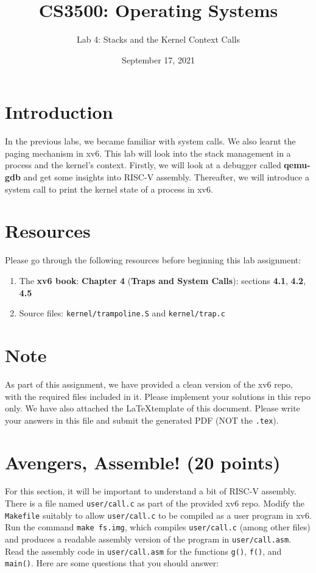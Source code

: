 \documentclass[11pt]{exam}
\title{\textbf{CS3500: Operating Systems}}
\subtitle{Lab 4: Stacks and the Kernel Context Calls\vspace{-1em}}
\date{September 17, 2021}
\begin{document}
\maketitle

\section*{Introduction} In the previous labs, we became familiar with system calls. We also learnt the paging mechanism in xv6. This lab will look into the stack management in a process and the kernel's context. Firstly, we will look at a debugger called \textbf{qemu-gdb} and get some insights into RISC-V assembly. Thereafter, we will introduce a system call to print the kernel state of a process in xv6.

\section*{Resources} Please go through the following resources before beginning this lab assignment:
\begin{enumerate}
    \item The \textbf{xv6 book}: \textbf{Chapter 4} (\textbf{Traps and System Calls}): sections \textbf{4.1}, \textbf{4.2}, \textbf{4.5}
    \item Source files: \texttt{kernel/trampoline.S} and \texttt{kernel/trap.c}
\end{enumerate}

\section*{Note} As part of this assignment, we have provided a clean version of the xv6 repo, with the required files included in it. Please implement your solutions in this repo only. We have also attached the \LaTeX template of this document. Please write your answers in this file and submit the generated PDF (NOT the \texttt{.tex}). 

\section{Avengers, Assemble! (20 points)}
For this section, it will be important to understand a bit of RISC-V assembly. \\

\noindent There is a file named \texttt{user/call.c} as part of the provided xv6 repo. Modify the \texttt{Makefile} suitably to allow \texttt{user/call.c} to be compiled as a user program in xv6. Run the command \texttt{make fs.img}, which compiles \texttt{user/call.c} (among other files) and produces a readable assembly version of the program in \texttt{user/call.asm}. \noindent Read the assembly code in \texttt{user/call.asm} for the functions \texttt{g()}, \texttt{f()}, and \texttt{main()}. Here are some questions that you should answer:
\end{document}
